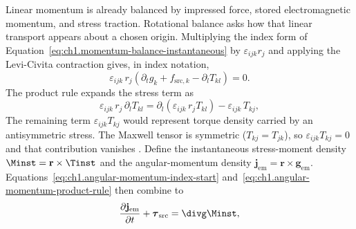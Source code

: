 Linear momentum is already balanced by impressed force, stored electromagnetic momentum, and stress traction. Rotational balance asks how that linear transport appears about a chosen origin. Multiplying the index form of Equation~\eqref{eq:ch1.momentum-balance-instantaneous} by $\varepsilon_{ijk}r_j$ and applying the Levi-Civita contraction gives, in index notation,
\begin{equation}
\label{eq:ch1.angular-momentum-index-start}
\varepsilon_{ijk}\,r_j\!\left(\partial_t g_k+f_{\mathrm{src},k}-\partial_l T_{kl}\right)
=0.
\end{equation}
The product rule expands the stress term as
\begin{equation}
\label{eq:ch1.angular-momentum-product-rule}
\varepsilon_{ijk}\,r_j\,\partial_l T_{kl}
=\partial_l\!\left(\varepsilon_{ijk}\,r_j T_{kl}\right)
-\varepsilon_{ijk}\,T_{kj},
\end{equation}
The remaining term $\varepsilon_{ijk}T_{kj}$ would represent torque density carried by an antisymmetric stress. The Maxwell tensor is symmetric ($T_{kj}=T_{jk}$), so $\varepsilon_{ijk}T_{kj}=0$ and that contribution vanishes \cite{maxwell1873,stratton1941}. Define the instantaneous stress-moment density $\Minst=\mathbf{r}\times\Tinst$ and the angular-momentum density $\mathbf{j}_{\mathrm{em}}=\mathbf{r}\times\mathbf{g}_{\mathrm{em}}$. Equations~\eqref{eq:ch1.angular-momentum-index-start} and~\eqref{eq:ch1.angular-momentum-product-rule} then combine to
\begin{equation}
\label{eq:ch1.angular-momentum-balance}
\frac{\partial\mathbf{j}_{\mathrm{em}}}{\partial t}+\boldsymbol{\tau}_{\mathrm{src}}
=\divg\Minst,
\end{equation}
